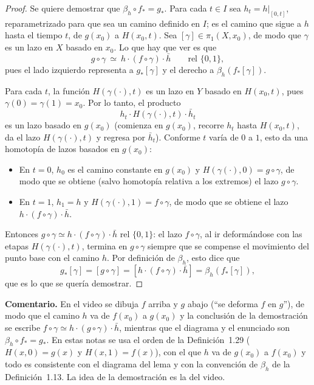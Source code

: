 \documentclass[11pt]{article}
\begin{document}
\begin{proof}
Se quiere demostrar que $\beta_h\circ f_*=g_*$. Para cada $t\in I$ sea $h_t=h|_{[0,t]}$, reparametrizado para que sea un camino definido en $I$; es el camino que sigue a $h$ hasta el tiempo $t$, de $g(x_0)$ a $H(x_0,t)$. Sea $[\gamma]\in\pi_1(X,x_0)$, de modo que $\gamma$ es un lazo en $X$ basado en $x_0$. Lo que hay que ver es que
\[
  g\circ\gamma\ \simeq\ h\cdot(f\circ\gamma)\cdot\bar h\qquad\text{rel }\{0,1\},
\]
pues el lado izquierdo representa a $g_*[\gamma]$ y el derecho a $\beta_h(f_*[\gamma])$.

Para cada $t$, la función $H(\gamma(\cdot),t)$ es un lazo en $Y$ basado en $H(x_0,t)$, pues $\gamma(0)=\gamma(1)=x_0$. Por lo tanto, el producto
\[
  h_t\cdot H(\gamma(\cdot),t)\cdot\bar h_t
\]
es un lazo basado en $g(x_0)$ (comienza en $g(x_0)$, recorre $h_t$ hasta $H(x_0,t)$, da el lazo $H(\gamma(\cdot),t)$ y regresa por $\bar h_t$). Conforme $t$ varía de $0$ a $1$, esto da una homotopía de lazos basados en $g(x_0)$:
\begin{itemize}
  \item En $t=0$, $h_0$ es el camino constante en $g(x_0)$ y $H(\gamma(\cdot),0)=g\circ\gamma$, de modo que se obtiene (salvo homotopía relativa a los extremos) el lazo $g\circ\gamma$.
  \item En $t=1$, $h_1=h$ y $H(\gamma(\cdot),1)=f\circ\gamma$, de modo que se obtiene el lazo $h\cdot(f\circ\gamma)\cdot\bar h$.
\end{itemize}
Entonces $g\circ\gamma\simeq h\cdot(f\circ\gamma)\cdot\bar h$ rel $\{0,1\}$: el lazo $f\circ\gamma$, al ir deformándose con las etapas $H(\gamma(\cdot),t)$, termina en $g\circ\gamma$ siempre que se compense el movimiento del punto base con el camino $h$. Por definición de $\beta_h$, esto dice que
\[
  g_*[\gamma]=[g\circ\gamma]=[h\cdot(f\circ\gamma)\cdot\bar h]=\beta_h(f_*[\gamma]),
\]
que es lo que se quería demostrar.
\end{proof}

\noindent\textbf{Comentario.} En el video se dibuja $f$ arriba y $g$ abajo (``se deforma $f$ en $g$''), de modo que el camino $h$ va de $f(x_0)$ a $g(x_0)$ y la conclusión de la demostración se escribe $f\circ\gamma\simeq h\cdot(g\circ\gamma)\cdot\bar h$, mientras que el diagrama y el enunciado son $\beta_h\circ f_*=g_*$. En estas notas se usa el orden de la Definición~1.29 ($H(x,0)=g(x)$ y $H(x,1)=f(x)$), con el que $h$ va de $g(x_0)$ a $f(x_0)$ y todo es consistente con el diagrama del lema y con la convención de $\beta_h$ de la Definición~1.13. La idea de la demostración es la del video.

\begin{erratas}
\end{erratas}
\end{document}
